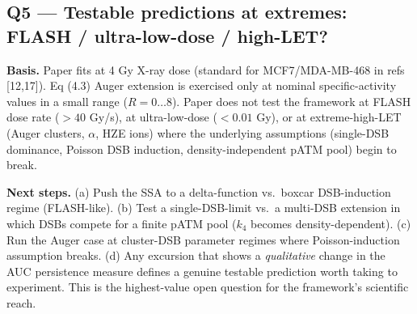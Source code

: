 \subsection*{Q5 --- Testable predictions at extremes: FLASH / ultra-low-dose / high-LET?}

\textbf{Basis.} Paper fits at 4 Gy X-ray dose (standard for MCF7/MDA-MB-468 in refs [12,17]).
Eq (4.3) Auger extension is exercised only at nominal specific-activity values in a small
range ($R = 0\ldots 8$). Paper does not test the framework at FLASH dose rate ($> 40$ Gy/s),
at ultra-low-dose ($< 0.01$ Gy), or at extreme-high-LET (Auger clusters, $\alpha$, HZE ions)
where the underlying assumptions (single-DSB dominance, Poisson DSB induction, density-independent
pATM pool) begin to break.

\textbf{Next steps.} (a) Push the SSA to a delta-function vs.\ boxcar DSB-induction regime
(FLASH-like). (b) Test a single-DSB-limit vs.\ a multi-DSB extension in which DSBs compete for
a finite pATM pool ($k_4$ becomes density-dependent). (c) Run the Auger case at cluster-DSB
parameter regimes where Poisson-induction assumption breaks. (d) Any excursion that shows a
\emph{qualitative} change in the AUC persistence measure defines a genuine testable prediction
worth taking to experiment. This is the highest-value open question for the framework's
scientific reach.
